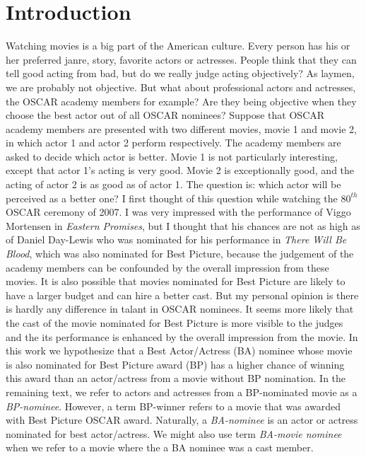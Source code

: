 \documentclass[10pt,letterpaper]{article}
\begin{document}
\section*{Introduction}
Watching movies is a big part of the American culture. Every person has his or her preferred janre, story, favorite actors or actresses. People think that they can tell good acting from bad, but do we really judge acting objectively? As laymen, we are probably not objective. But what about professional actors and actresses, the OSCAR academy members for example? Are they being objective when they choose the best actor out of all OSCAR nominees? Suppose that OSCAR academy members are presented with two different movies, movie 1 and movie 2, in which actor 1 and actor 2 perform respectively. The academy members are asked to decide which actor is better. Movie 1 is not particularly interesting, except that actor 1's acting is very good. Movie 2 is exceptionally good, and the acting of actor 2 is as good as of actor 1. The question is: which actor will be perceived as a better one? I first thought of this question while watching the $80^{th}$ OSCAR ceremony of 2007. I was very impressed with the performance of Viggo Mortensen in \emph{Eastern Promises}, but I thought that his chances are not as high as of Daniel Day-Lewis who was nominated for his performance in \emph{There Will Be Blood}, which was also nominated for Best Picture, because the judgement of the academy members can be confounded by the overall impression from these movies. It is also possible that movies nominated for Best Picture are likely to have a larger budget and can hire a better cast. But my personal opinion is there is hardly any difference in talant in OSCAR nominees. It seems more likely that the cast of the movie nominated for Best Picture is more visible to the judges and the its performance is enhanced by the overall impression from the movie. In this work we hypothesize that a Best Actor/Actress (BA) nominee whose movie is also nominated for Best Picture award (BP) has a higher chance of winning this award than an actor/actress from a movie without BP nomination. In the remaining text, we refer to actors and actresses from a BP-nominated movie as a \emph{BP-nominee}. However, a term BP-winner refers to a movie that was awarded with Best Picture OSCAR award. Naturally, a \emph{BA-nominee} is an actor or actress nominated for best actor/actress. We might also use term \emph{BA-movie nominee} when we refer to a movie where the a BA nominee was a cast member.
\end{document}
